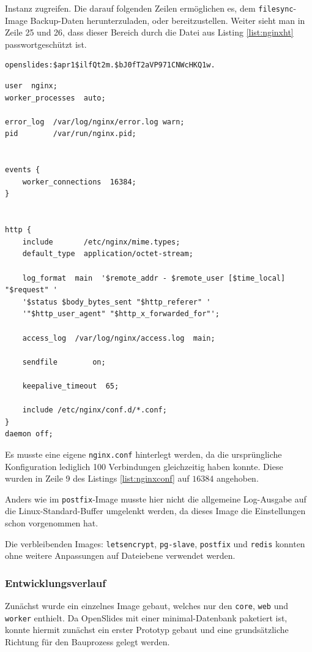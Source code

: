 \documentclass[11pt,a4paper]{article}
\begin{document}
Instanz zugreifen. Die darauf folgenden Zeilen ermöglichen es, dem 
\texttt{filesync}-Image Backup-Daten herunterzuladen, oder bereitzustellen. 
Weiter sieht man in Zeile 25 und 26, dass dieser Bereich durch die Datei aus 
Listing \ref{list:nginxht} passwortgeschützt ist. 
\begin{lstlisting}[firstnumber=1,
	caption=\texttt{htpasswd} für das \texttt{nginx}-Image - 
	\cite{osdockcont},
	label={list:nginxht}]
openslides:$apr1$ilfQt2m.$bJ0fT2aVP971CNWcHKQ1w.
\end{lstlisting}
\newpage
\begin{lstlisting}[firstnumber=1,
	caption=\texttt{nginx.conf} für das \texttt{nginx}-Image - 
	\cite{osdockcont},
	label={list:nginxconf}]
user  nginx;
worker_processes  auto;

error_log  /var/log/nginx/error.log warn;
pid        /var/run/nginx.pid;


events {
	worker_connections  16384;
}


http {
	include       /etc/nginx/mime.types;
	default_type  application/octet-stream;

	log_format  main  '$remote_addr - $remote_user [$time_local] "$request" '
	'$status $body_bytes_sent "$http_referer" '
	'"$http_user_agent" "$http_x_forwarded_for"';

	access_log  /var/log/nginx/access.log  main;

	sendfile        on;

	keepalive_timeout  65;

	include /etc/nginx/conf.d/*.conf;
}
daemon off;
\end{lstlisting}
Es musste eine eigene \texttt{nginx.conf} hinterlegt werden, da die 
ursprüngliche Konfiguration lediglich 100 Verbindungen gleichzeitig haben 
konnte. Diese wurden in Zeile 9 des Listings \ref{list:nginxconf} auf $16384$ 
angehoben.

Anders wie im \texttt{postfix}-Image musste hier nicht die allgemeine 
Log-Ausgabe auf die Linux-Standard-Buffer umgelenkt werden, da dieses Image die 
Einstellungen schon vorgenommen hat.

Die verbleibenden Images: \texttt{letsencrypt}, \texttt{pg-slave}, 
\texttt{postfix} und \texttt{redis} konnten ohne weitere Anpassungen auf 
Dateiebene verwendet werden.
\newpage
\subsubsection{Entwicklungsverlauf}
Zunächst wurde ein einzelnes Image gebaut, welches nur den \texttt{core}, 
\texttt{web} und \texttt{worker} enthielt. Da OpenSlides mit einer 
minimal-Datenbank paketiert ist, konnte hiermit zunächst ein erster Prototyp 
gebaut und eine grundsätzliche Richtung für den Bauprozess gelegt werden.
\end{document}
